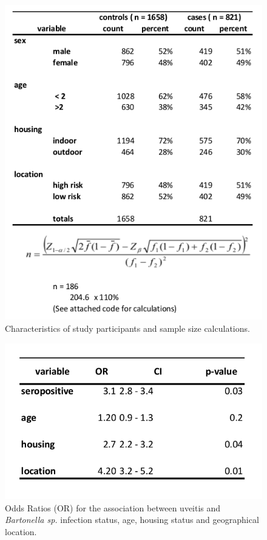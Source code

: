 \documentclass[11pt,twocolumn]{article}
\begin{document}
\begin{figure}[h!]
	\centering
	\includegraphics[scale=0.5]{table1.jpg}
	\caption{Characteristics of study participants and sample size calculations.}
	\label{tab:1}
\end{figure}
 
\begin{figure}[h!]
	\centering
	\includegraphics[scale=0.5]{table2.jpg}
	\caption{Odds Ratios (OR) for the association between uveitis and \emph{Bartonella sp.} infection status, age, housing status and geographical location.}
	\label{tab:2}
\end{figure}
\end{document}

